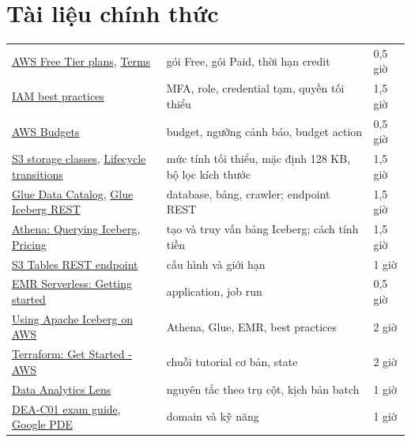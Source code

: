 \section{Tài liệu chính thức}
\begin{xltabular}{\textwidth}{@{}P{4.2cm} L P{1.8cm}@{}}
\toprule
{} &  &  \\
\midrule
\endhead
\bottomrule
\endfoot
\href{https://docs.aws.amazon.com/awsaccountbilling/latest/aboutv2/free-tier-plans.html}{AWS Free Tier plans}, \href{https://aws.amazon.com/free/terms}{Terms} & gói Free, gói Paid, thời hạn credit & 0,5 giờ \\
\href{https://docs.aws.amazon.com/IAM/latest/UserGuide/best-practices.html}{IAM best practices} & MFA, role, credential tạm, quyền tối thiểu & 1,5 giờ \\
\href{https://docs.aws.amazon.com/cost-management/latest/userguide/budgets-managing-costs.html}{AWS Budgets} & budget, ngưỡng cảnh báo, budget action & 0,5 giờ \\
\href{https://docs.aws.amazon.com/AmazonS3/latest/userguide/storage-class-intro.html}{S3 storage classes}, \href{https://docs.aws.amazon.com/AmazonS3/latest/userguide/lifecycle-transition-general-considerations.html}{Lifecycle transitions} & mức tính tối thiểu, mặc định 128 KB, bộ lọc kích thước & 1,5 giờ \\
\href{https://docs.aws.amazon.com/glue/latest/dg/catalog-and-crawler.html}{Glue Data Catalog}, \href{https://docs.aws.amazon.com/glue/latest/dg/connect-glu-iceberg-rest.html}{Glue Iceberg REST} & database, bảng, crawler; endpoint REST & 1,5 giờ \\
\href{https://docs.aws.amazon.com/athena/latest/ug/querying-iceberg.html}{Athena: Querying Iceberg}, \href{https://aws.amazon.com/athena/pricing/}{Pricing} & tạo và truy vấn bảng Iceberg; cách tính tiền & 1,5 giờ \\
\href{https://docs.aws.amazon.com/AmazonS3/latest/userguide/s3-tables-integrating-open-source.html}{S3 Tables REST endpoint} & cấu hình và giới hạn & 1 giờ \\
\href{https://docs.aws.amazon.com/emr/latest/EMR-Serverless-UserGuide/getting-started.html}{EMR Serverless: Getting started} & application, job run & 0,5 giờ \\
\href{https://docs.aws.amazon.com/prescriptive-guidance/latest/apache-iceberg-on-aws/introduction.html}{Using Apache Iceberg on AWS} & Athena, Glue, EMR, best practices & 2 giờ \\
\href{https://developer.hashicorp.com/terraform/tutorials/aws-get-started}{Terraform: Get Started - AWS} & chuỗi tutorial cơ bản, state & 2 giờ \\
\href{https://docs.aws.amazon.com/wellarchitected/latest/analytics-lens/analytics-lens.html}{Data Analytics Lens} & nguyên tắc theo trụ cột, kịch bản batch & 1 giờ \\
\href{https://docs.aws.amazon.com/aws-certification/latest/data-engineer-associate-01/data-engineer-associate-01.html}{DEA-C01 exam guide}, \href{https://cloud.google.com/learn/certification/data-engineer}{Google PDE} & domain và kỹ năng & 1 giờ \\
\end{xltabular}

